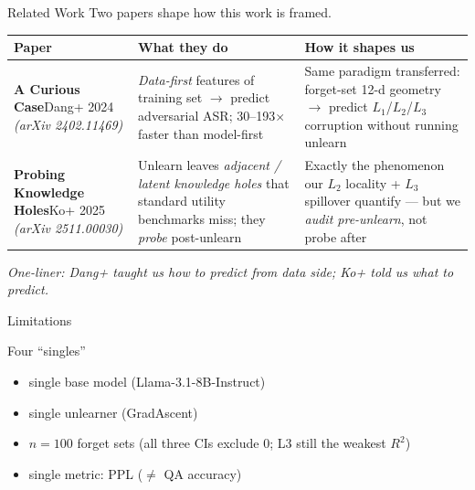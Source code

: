 \documentclass[aspectratio=169,10pt]{beamer}
\begin{document}
\begin{frame}{Related Work}
    \small
    Two papers shape how this work is framed.

    \vspace{0.5em}
    \renewcommand{\arraystretch}{1.25}
    \begin{tabular}{@{}p{}p{}p{}@{}}
        \toprule
        \textbf{Paper} & \textbf{What they do} & \textbf{How it shapes us} \\
        \midrule
        \textbf{A Curious Case}\newline\scriptsize Dang+ 2024 \emph{(arXiv 2402.11469)}
            & \emph{Data-first} features of training set $\to$ predict adversarial ASR; 30--193$\times$ faster than model-first
            & Same paradigm transferred: forget-set 12-d geometry $\to$ predict $L_1$/$L_2$/$L_3$ corruption without running unlearn \\
        \midrule
        \textbf{Probing Knowledge Holes}\newline\scriptsize Ko+ 2025 \emph{(arXiv 2511.00030)}
            & Unlearn leaves \emph{adjacent / latent knowledge holes} that standard utility benchmarks miss; they \emph{probe} post-unlearn
            & Exactly the phenomenon our $L_2$ locality + $L_3$ spillover quantify --- but we \emph{audit pre-unlearn}, not probe after \\
        \bottomrule
    \end{tabular}

    \vspace{0.5em}
    \footnotesize\itshape
    One-liner: Dang+ taught us \emph{how to predict from data side}; Ko+ told us \emph{what to predict}.
\end{frame}

\begin{frame}{Limitations}
    \vspace{0.3em}
    \begin{center}
        \large
        Four ``singles''
    \end{center}

    \vspace{0.6em}
    \begin{itemize}
        \setlength\itemsep{0.6em}
        \item single base model (Llama-3.1-8B-Instruct)
        \item single unlearner (GradAscent)
        \item $n = 100$ forget sets (all three CIs exclude 0; L3 still the weakest $R^2$)
        \item single metric: PPL ($\neq$ QA accuracy)
    \end{itemize}
\end{frame}
\end{document}
